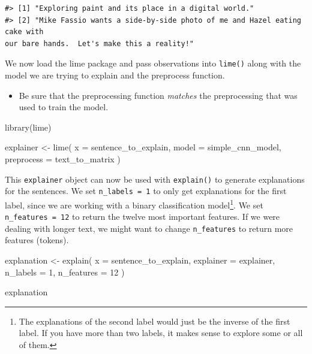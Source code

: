 \documentclass[
]{krantz}
\makeatletter
\newenvironment{Shaded}{\begin{snugshade}}{\end{snugshade}}
\newcommand{\AttributeTok}[1]{\textcolor[rgb]{0.77,0.63,0.00}{#1}}
\newcommand{\DecValTok}[1]{\textcolor[rgb]{0.00,0.00,0.81}{#1}}
\newcommand{\FunctionTok}[1]{\textcolor[rgb]{0.00,0.00,0.00}{#1}}
\newcommand{\NormalTok}[1]{#1}
\newcommand{\OtherTok}[1]{\textcolor[rgb]{0.56,0.35,0.01}{#1}}
\newenvironment{kframe}{%
\medskip{}
\setlength{\fboxsep}{.8em}
 \def\at@end@of@kframe{}%
 \ifinner\ifhmode%
  \def\at@end@of@kframe{\end{minipage}}%
  \begin{minipage}{\columnwidth}%
 \fi\fi%
 \def\FrameCommand##1{\hskip\@totalleftmargin \hskip-\fboxsep
 \colorbox{shadecolor}{##1}\hskip-\fboxsep
     \hskip-\linewidth \hskip-\@totalleftmargin \hskip\columnwidth}%
 \MakeFramed {\advance\hsize-\width
   \@totalleftmargin\z@ \linewidth\hsize
   \@setminipage}}%
 {\par\unskip\endMakeFramed%
 \at@end@of@kframe}
\renewenvironment{Shaded}{\begin{kframe}}{\end{kframe}}
\newenvironment{rmdblock}[1]
  {\begin{shaded*}
  \begin{itemize}[left = -1cm, labelsep = 1cm]
  \renewcommand{\labelitemi}{
    \raisebox{-.7\height}[0pt][0pt]{
      {\setkeys{Gin}{width=3em,keepaspectratio}\texttt{[image: images/\#1]}}
    }
  }
 
  \item
  }
  {
  \end{itemize}
  \end{shaded*}
  }
\newenvironment{rmdwarning}
  {\begin{rmdblock}{warning}}
  {\end{rmdblock}}
\makeatother
\begin{document}
\begin{verbatim}
#> [1] "Exploring paint and its place in a digital world."
#> [2] "Mike Fassio wants a side-by-side photo of me and Hazel eating cake with
our bare hands.  Let's make this a reality!"
\end{verbatim}

We now load the lime package and pass observations into \texttt{lime()} along with the model we are trying to explain and the preprocess function.

\begin{rmdwarning}
Be sure that the preprocessing function \emph{matches} the preprocessing
that was used to train the model.
\end{rmdwarning}

\begin{Shaded}
\begin{Highlighting}[]
\FunctionTok{library}\NormalTok{(lime)}

\NormalTok{explainer }\OtherTok{\textless{}{-}} \FunctionTok{lime}\NormalTok{(}
  \AttributeTok{x =}\NormalTok{ sentence\_to\_explain,}
  \AttributeTok{model =}\NormalTok{ simple\_cnn\_model,}
  \AttributeTok{preprocess =}\NormalTok{ text\_to\_matrix}
\NormalTok{)}
\end{Highlighting}
\end{Shaded}

This \texttt{explainer} object can now be used with \texttt{explain()} to generate explanations for the sentences. We set \texttt{n\_labels\ =\ 1} to only get explanations for the first label, since we are working with a binary classification model\footnote{The explanations of the second label would just be the inverse of the first label. If you have more than two labels, it makes sense to explore some or all of them.}. We set \texttt{n\_features\ =\ 12} to return the twelve most important features. If we were dealing with longer text, we might want to change \texttt{n\_features} to return more features (tokens).

\begin{Shaded}
\begin{Highlighting}[]
\NormalTok{explanation }\OtherTok{\textless{}{-}} \FunctionTok{explain}\NormalTok{(}
  \AttributeTok{x =}\NormalTok{ sentence\_to\_explain,}
  \AttributeTok{explainer =}\NormalTok{ explainer,}
  \AttributeTok{n\_labels =} \DecValTok{1}\NormalTok{,}
  \AttributeTok{n\_features =} \DecValTok{12}
\NormalTok{)}

\NormalTok{explanation}
\end{Highlighting}
\end{Shaded}
\end{document}
